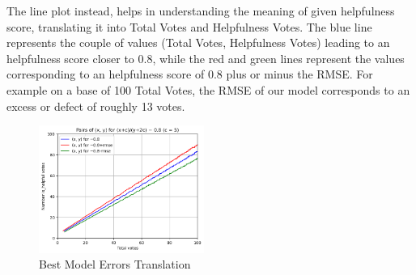 \noindent
The line plot instead, helps in understanding the meaning of given helpfulness score, translating it into Total Votes and Helpfulness Votes.
The blue line represents the couple of values (Total Votes, Helpfulness Votes) leading to an helpfulness score closer to 0.8, while the red and green lines
represent the values corresponding to an helpfulness score of 0.8 plus or minus the RMSE. For example on a base of 100 Total Votes, the RMSE of 
our model corresponds to an excess or defect of roughly 13 votes.\\
\begin{figure}[H]
    \centering
    \includegraphics[width=0.48\textwidth]{./figures/model_best_lines.png}
    \caption{Best Model Errors Translation}
    \label{fig:model_best_lines}
\end{figure}




